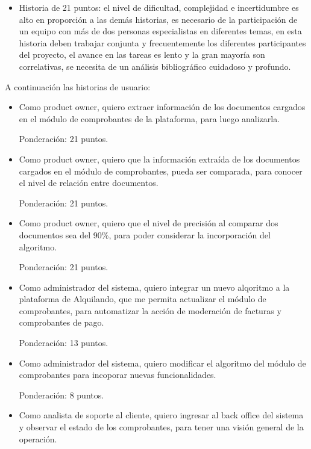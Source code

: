 \documentclass[
11pt, %
]{charter}
\begin{document}
\begin{•}
\begin{itemize}
	\item Historia de 21 puntos: el nivel de dificultad, complejidad e incertidumbre es alto en proporción a las demás historias, es necesario de la participación de un equipo con más de dos personas especialistas en diferentes temas, en esta historia deben trabajar conjunta y frecuentemente los diferentes participantes del proyecto, el avance en las tareas es lento y la gran mayoría son correlativas, se necesita de un análisis bibliográfico cuidadoso y profundo.
	
	
\end{itemize}

A continuación las historias de usuario:

\begin{itemize}

	\item Como product owner, quiero extraer información de los documentos cargados en el módulo de comprobantes de la plataforma, para luego analizarla.
	
	Ponderación: 21 puntos.
	
	\item Como product owner, quiero que la información extraída de los documentos cargados en el módulo de comprobantes, pueda ser comparada, para conocer el nivel de relación entre documentos.
	
	Ponderación: 21 puntos.
	
	\item Como product owner, quiero que el nivel de precisión al comparar dos documentos sea del 90\%, para poder considerar la incorporación del algoritmo.
	
	Ponderación: 21 puntos.
	
	\item Como administrador del sistema, quiero integrar un nuevo alqoritmo a la plataforma de Alquilando, que me permita actualizar el módulo de comprobantes, para automatizar la acción de moderación de facturas y comprobantes de pago.
	
	Ponderación: 13 puntos.
	
	\item Como administrador del sistema, quiero modificar el algoritmo del módulo de comprobantes para incoporar nuevas funcionalidades.
	
	Ponderación: 8 puntos.
	
	\item Como analista de soporte al cliente, quiero ingresar al back office del sistema y observar el estado de los comprobantes, para tener una visión general de la operación.
	

\end{itemize}
\end{•}
\end{document}
